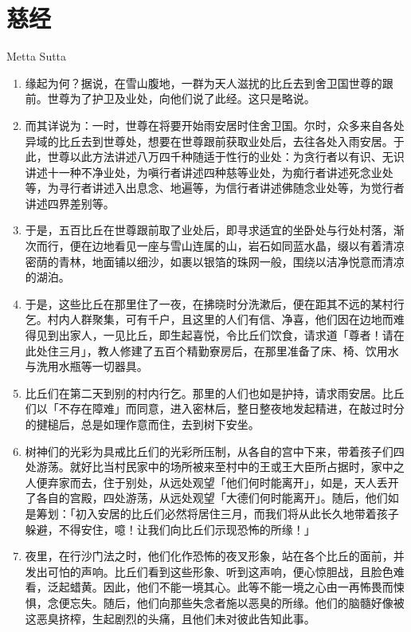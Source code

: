 \section{慈经}

\begin{center}Metta Sutta\end{center}\vspace{1em}

\begin{enumerate}\item 缘起为何？据说，在雪山腹地，一群为天人滋扰的比丘去到舍卫国世尊的跟前。世尊为了护卫及业处，向他们说了此经。这只是略说。
\item 而其详说为：一时，世尊在将要开始雨安居时住舍卫国。尔时，众多来自各处异域的比丘去到世尊处，想要在世尊跟前获取业处后，去往各处入雨安居。于此，世尊以此方法讲述八万四千种随适于性行的业处：为贪行者以有识、无识讲述十一种不净业处，为嗔行者讲述四种慈等业处，为痴行者讲述死念业处等，为寻行者讲述入出息念、地遍等，为信行者讲述佛随念业处等，为觉行者讲述四界差别等。
\item 于是，五百比丘在世尊跟前取了业处后，即寻求适宜的坐卧处与行处村落，渐次而行，便在边地看见一座与雪山连属的山，岩石如同蓝水晶，缀以有着清凉密荫的青林，地面铺以细沙，如裹以银箔的珠网一般，围绕以洁净悦意而清凉的湖泊。
\item 于是，这些比丘在那里住了一夜，在拂晓时分洗漱后，便在距其不远的某村行乞。村内人群聚集，可有千户，且这里的人们有信、净喜，他们因在边地而难得见到出家人，一见比丘，即生起喜悦，令比丘们饮食，请求道「尊者！请在此处住三月」，教人修建了五百个精勤寮房后，在那里准备了床、椅、饮用水与洗用水瓶等一切器具。
\item 比丘们在第二天到别的村内行乞。那里的人们也如是护持，请求雨安居。比丘们以「不存在障难」而同意，进入密林后，整日整夜地发起精进，在敲过时分的揵槌后，总是如理作意而住，去到树下安坐。
\item 树神们的光彩为具戒比丘们的光彩所压制，从各自的宫中下来，带着孩子们四处游荡。就好比当村民家中的场所被来至村中的王或王大臣所占据时，家中之人便弃家而去，住于别处，从远处观望「他们何时能离开」，如是，天人丢开了各自的宫殿，四处游荡，从远处观望「大德们何时能离开」。随后，他们如是筹划：「初入安居的比丘们必然将居住三月，而我们将从此长久地带着孩子躲避，不得安住，噫！让我们向比丘们示现恐怖的所缘！」
\item 夜里，在行沙门法之时，他们化作恐怖的夜叉形象，站在各个比丘的面前，并发出可怕的声响。比丘们看到这些形象、听到这声响，便心惊胆战，且脸色难看，泛起蜡黄。因此，他们不能一境其心。此等不能一境之心由一再怖畏而悚惧，念便忘失。随后，他们向那些失念者施以恶臭的所缘。他们的脑髓好像被这恶臭挤榨，生起剧烈的头痛，且他们未对彼此告知此事。

\end{enumerate}
